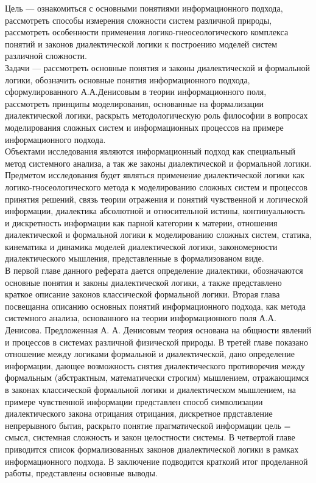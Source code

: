 \documentclass[a4paper,12pt]{report}
\begin{document}
	Цель — ознакомиться с основными понятиями информационного подхода, рассмотреть способы измерения сложности систем различной природы, рассмотреть особенности применения логико-гнеосеологического комплекса понятий и законов диалектической логики к построению моделей систем различной сложности.\\
	
	Задачи —  рассмотреть основные понятия и законы диалектической и формальной логики,  обозначить основные понятия информационного подхода, сформулированного А.А.Денисовым в теории информационного поля, рассмотреть принципы моделирования, основанные на формализации диалектической логики, раскрыть методологическую роль философии в  вопросах моделирования сложных систем и информационных процессов на примере информационного подхода. \\
	
	Объектами исследования являются информационный подход как специальный метод системного анализа, а так же законы диалектической и формальной логики.\\
	
	Предметом исследования будет являться применение диалектической логики как логико-гносеологического метода к моделированию сложных систем и процессов принятия решений, связь теории отражения и понятий чувственной и логической информации, диалектика абсолютной и относительной истины, континуальность и дискретность информации как парной категории к материи,  отношения диалектической и формальной логики к моделированию сложных систем, статика, кинематика и динамика моделей диалектической логики,  закономерности диалектического мышления, представленные в формализованом виде.\\
	
	В первой главе данного реферата дается  определение диалектики, обозначаются основные понятия и законы диалектической логики, а также представлено краткое описание законов классической формальной логики.  Вторая глава посвещанна описанию основных понятий информационного подхода, как метода системного анализа, основанного на теории информационного поля А.А. Денисова. Предложенная А. А. Денисовым теория основана на общности явлений и процессов в системах различной физической природы. В третей главе показано отношение между логиками формальной и диалектической, дано определение информации, дающее возможность снятия диалектического  противоречия между формальным (абстрактным, математически строгим) мышлением, отражающимся в законах классической формальной логики и диалектическом мышлением, на примере чувственной информации представлен способ символизации диалектического закона отрицания отрицания, дискретное прдставление непрерывного бытия, раскрыто понятие прагматической информации цель = смысл, системная сложность и закон целостности системы. В четвертой главе приводится список формализованных законов диалектической логики в рамках информационного подхода. В заключение подводится краткоий итог проделанной работы, представлены основные выводы.  
\\
\end{document}
